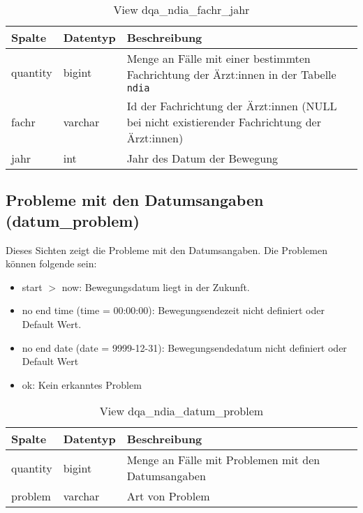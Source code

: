 \begin{table}[ht]
	\centering   
	\caption{View dqa\_ndia\_fachr\_jahr}
	\label{tab:bewFachrJ}
	\begin{tabular}{||l|l|p{10cm}||}   		
		\hline
		Spalte & Datentyp & Beschreibung \\ [0.5ex]
		\hline\hline
		quantity & bigint & Menge an Fälle mit einer bestimmten Fachrichtung der Ärzt:innen in der Tabelle \texttt{ndia}\\
		\hline
		fachr & varchar & Id der Fachrichtung der Ärzt:innen (NULL bei nicht existierender Fachrichtung der Ärzt:innen)\\
		\hline
		jahr & int &  Jahr des Datum der Bewegung \\
		\hline		
	\end{tabular}
\end{table}

\subsection{Probleme mit den Datumsangaben (datum\_problem)} \label{subsec:bewFalDat}

Dieses Sichten zeigt die Probleme mit den Datumsangaben. Die Problemen können folgende sein:

\begin{itemize}
	\item start $>$ now: Bewegungsdatum liegt in der Zukunft.
	\item no end time (time = 00:00:00): Bewegungsendezeit nicht definiert oder Default Wert.
	\item no end date (date = 9999-12-31): Bewegungsendedatum nicht definiert oder Default Wert
	\item ok: Kein erkanntes Problem
\end{itemize}
                          
\begin{table}[ht]
	\centering   
	\caption{View dqa\_ndia\_datum\_problem}
	\label{tab:bewFalDatI}
	\begin{tabular}{||l|l|p{10cm}||}   		
		\hline
		Spalte & Datentyp & Beschreibung \\ [0.5ex]
		\hline\hline
		quantity & bigint & Menge an Fälle mit Problemen mit den Datumsangaben \\
		\hline
		problem & varchar & Art von Problem \\
		\hline		
	\end{tabular}
\end{table}

